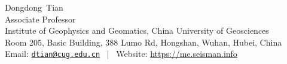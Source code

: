 \documentclass[11pt, a4paper]{article}
\makeatletter
\newcommand{\FirstName}{Dongdong}
\newcommand{\LastName}{Tian}
\newcommand{\MyName}{\FirstName\ \LastName}
\newcommand{\MyRole}{Associate Professor}
\newcommand{\Email}{dtian@cug.edu.cn}
\newcommand{\Website}{https://me.seisman.info}
\newcommand{\Affiliation}{Institute of Geophysics and Geomatics, China University of Geosciences}
\newcommand{\Address}{Room 205, Basic Building, 388 Lumo Rd, Hongshan, Wuhan, Hubei, China}
\newcommand{\makefield}[2]{\makebox[1.5em]{\color{MarkerColour!80!black}#1} #2}
\makeatother
\begin{document}
\thispagestyle{empty}

\begin{center}
    {\fontsize{28pt}{0}\selectfont \MyName}
    \\[0.5cm]
    {\fontsize{17pt}{0}\selectfont \MyRole}
    \\[0.3cm]
    {\fontsize{12pt}{0}\selectfont
        \Affiliation
        \\[0.2cm]
        \Address
        \\[0.08cm]
        Email: \href{mailto:\Email}{\texttt{\Email}}
        \, | \,
        Website: \url{\Website}
    }
\end{center}











\end{document}

